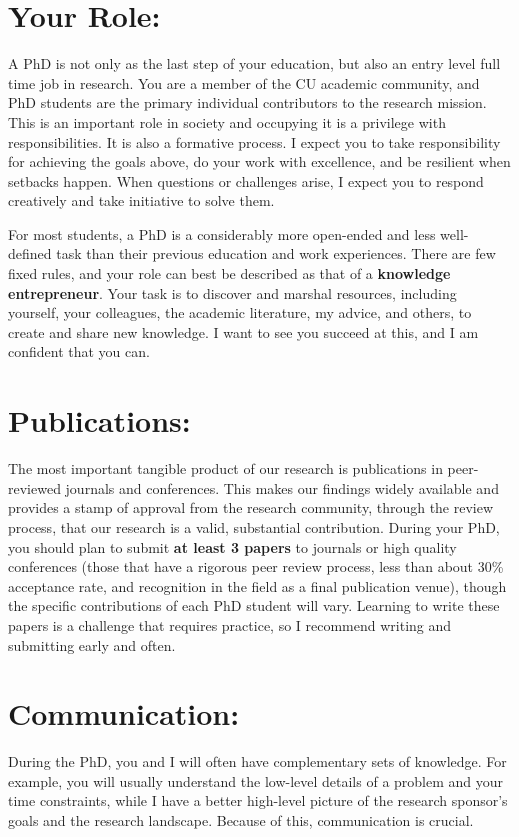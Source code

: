 \documentclass[11pt,letterpaper]{article}
\begin{document}
\section{Your Role:} A PhD is not only as the last step of your education, but also an entry level full time job in research. You are a member of the CU academic community, and PhD students are the primary individual contributors to the research mission. This is an important role in society and occupying it is a privilege with responsibilities. It is also a formative process. I expect you to take responsibility for achieving the goals above, do your work with excellence, and be resilient when setbacks happen. When questions or challenges arise, I expect you to respond creatively and take initiative to solve them.

For most students, a PhD is a considerably more open-ended and less well-defined task than their previous education and work experiences. There are few fixed rules, and your role can best be described as that of a \textbf{knowledge entrepreneur}. Your task is to discover and marshal resources, including yourself, your colleagues, the academic literature, my advice, and others, to create and share new knowledge. I want to see you succeed at this, and I am confident that you can.

\section{Publications:} The most important tangible product of our research is publications in peer-reviewed journals and conferences. This makes our findings widely available and provides a stamp of approval from the research community, through the review process, that our research is a valid, substantial contribution. During your PhD, you should plan to submit \textbf{at least 3 papers} to journals or high quality conferences (those that have a rigorous peer review process, less than about 30\% acceptance rate, and recognition in the field as a final publication venue), though the specific contributions of each PhD student will vary. Learning to write these papers is a challenge that requires practice, so I recommend writing and submitting early and often.

\section{Communication:} During the PhD, you and I will often have complementary sets of knowledge. For example, you will usually understand the low-level details of a problem and your time constraints, while I have a better high-level picture of the research sponsor's goals and the research landscape. Because of this, communication is crucial.
\end{document}
